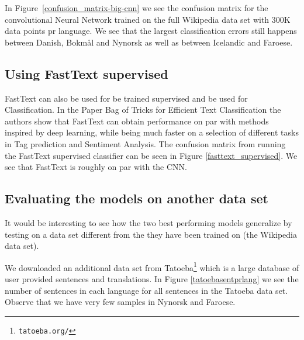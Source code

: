 
In Figure~\ref{confusion_matrix-big-cnn} we see the confusion matrix for the convolutional Neural Network trained on the full Wikipedia data set with 300K data points pr language. We see that the largest classification errors still happens between Danish, Bokmål and Nynorsk as well as between Icelandic and Faroese. 



\subsection{Using FastText supervised}

FastText can also be used for be trained supervised and be used for Classification. In the Paper Bag of Tricks for Efficient Text Classification \cite{BagOfTricks} the authors show that FastText can obtain performance on par with methods inspired by deep learning, while being much faster on a selection of different tasks in Tag prediction and Sentiment Analysis. The confusion matrix from running the FastText supervised classifier can be seen in Figure \ref{fasttext_supervised}. We see that FastText is roughly on par with the CNN.

\subsection{Evaluating the models on another data set}
It would be interesting to see how the two best performing models generalize by testing on a data set different from the they have been trained on (the Wikipedia data set).

We downloaded an additional data set from Tatoeba\footnote{{\tt tatoeba.org/}} which is a large database of user provided sentences and translations. In Figure \ref{tatoebasentprlang} we see the number of sentences in each language for all sentences in the Tatoeba data set. Observe that we have very few samples in Nynorsk and Faroese.

